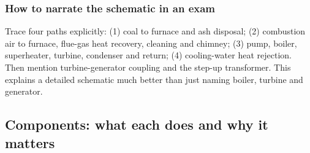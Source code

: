 \documentclass[11pt,a4paper]{article}
\begin{document}
\subsubsection{How to narrate the schematic in an exam}
Trace four paths explicitly: (1) coal to furnace and ash disposal; (2) combustion air to furnace, flue-gas heat recovery, cleaning and chimney; (3) pump, boiler, superheater, turbine, condenser and return; (4) cooling-water heat rejection. Then mention turbine-generator coupling and the step-up transformer. This explains a detailed schematic much better than just naming boiler, turbine and generator.

\subsection{Components: what each does and why it matters}
\end{document}
